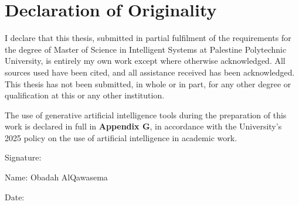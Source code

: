 \chapter*{Declaration of Originality}

I declare that this thesis, submitted in partial fulfilment of the requirements for the degree of Master of Science in Intelligent Systems at Palestine Polytechnic University, is entirely my own work except where otherwise acknowledged. All sources used have been cited, and all assistance received has been acknowledged. This thesis has not been submitted, in whole or in part, for any other degree or qualification at this or any other institution.

The use of generative artificial intelligence tools during the preparation of this work is declared in full in \textbf{Appendix G}, in accordance with the University's 2025 policy on the use of artificial intelligence in academic work.

\vspace{2cm}
\noindent Signature: \makebox[6cm]{\hrulefill}

\vspace{0.5cm}
\noindent Name: Obadah AlQawasema

\vspace{0.5cm}
\noindent Date: \makebox[6cm]{\hrulefill}
